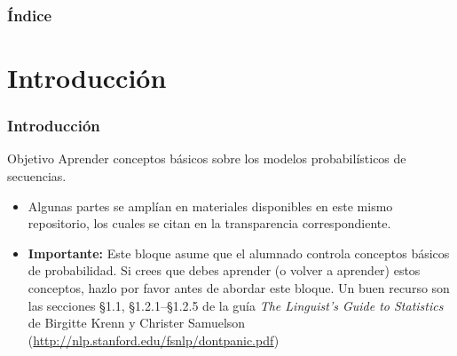 



\begin{frame}
  \titlepage
\end{frame}

\begin{frame}
  \frametitle{Índice}
  \tableofcontents 
\end{frame}

  
\section{Introducción}
\begin{frame} 
\frametitle{Introducción}

\begin{block}{Objetivo}
  Aprender conceptos básicos sobre los modelos probabilísticos de secuencias.
\end{block}

\begin{itemize}
\item Algunas partes se amplían en materiales disponibles en este mismo repositorio, los cuales se citan en la transparencia correspondiente.
\item \textbf{Importante:} Este bloque asume que el alumnado controla conceptos básicos de probabilidad. Si crees que debes aprender (o volver a aprender) estos conceptos, hazlo por favor antes de abordar este bloque. Un buen recurso son las secciones §1.1, §1.2.1–§1.2.5 de la guía \emph{The Linguist's Guide to Statistics} de Birgitte Krenn y Christer Samuelson (\url{http://nlp.stanford.edu/fsnlp/dontpanic.pdf})

\end{itemize}
\end{frame}
